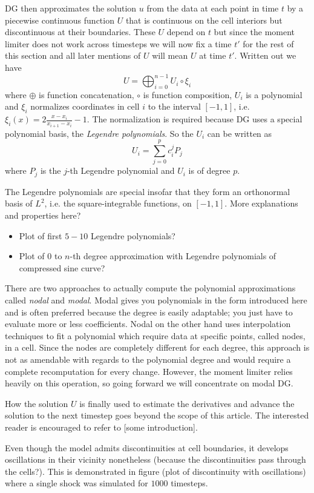 DG then approximates the solution $u$ from the data at each point in time $t$ by a piecewise continuous function $U$ that is continuous on the cell interiors but discontinuous at their boundaries.
These $U$ depend on $t$ but since the moment limiter does not work across timesteps we will now fix a time $t'$ for the rest of this section and all later mentions of $U$ will mean $U$ at time $t'$.
Written out we have
\begin{equation*}
  U = \bigoplus_{i = 0}^{n - 1} U_{i} \circ \xi_{i}
\end{equation*}
where $\oplus$ is function concatenation, $\circ$ is function composition, $U_{i}$ is a polynomial and $\xi_{i}$ normalizes coordinates in cell $i$ to the interval $[-1, 1]$, i.e. $\xi_{i}(x) = 2 \frac{x - x_{i}}{x_{i + 1} - x_{i}} - 1$.
The normalization is required because DG uses a special polynomial basis, the \emph{Legendre polynomials}.
So the $U_{i}$ can be written as
\begin{equation*}
  U_{i} = \sum_{j = 0}^{p} c_{i}^{j} P_{j}
\end{equation*}
where $P_{j}$ is the $j$-th Legendre polynomial and $U_{i}$ is of degree $p$.

The Legendre polynomials are special insofar that they form an orthonormal basis of $L^{2}$, i.e. the square-integrable functions, on $[-1, 1]$.
More explanations and properties here?
\begin{itemize}
\item Plot of first $5-10$ Legendre polynomials?
\item Plot of $0$ to $n$-th degree approximation with Legendre polynomials of compressed sine curve?
\end{itemize}

There are two approaches to actually compute the polynomial approximations called \emph{nodal} and \emph{modal}.
Modal gives you polynomials in the form introduced here and is often preferred because the degree is easily adaptable; you just have to evaluate more or less coefficients.
Nodal on the other hand uses interpolation techniques to fit a polynomial which require data at specific points, called nodes, in a cell.
Since the nodes are completely different for each degree, this approach is not as amendable with regards to the polynomial degree and would require a complete recomputation for every change.
However, the moment limiter relies heavily on this operation, so going forward we will concentrate on modal DG.

How the solution $U$ is finally used to estimate the derivatives and advance the solution to the next timestep goes beyond the scope of this article.
The interested reader is encouraged to refer to [some introduction].

Even though the model admits discontinuities at cell boundaries, it develops oscillations in their vicinity nonetheless (because the discontinuities pass through the cells?).
This is demonstrated in figure (plot of discontinuity with oscillations) where a single shock was simulated for $1000$ timesteps.
